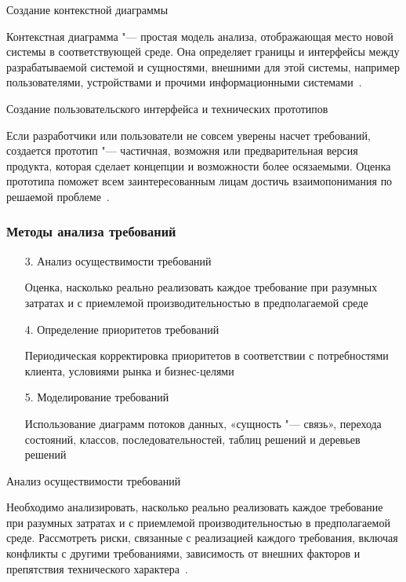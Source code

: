 \documentclass{../industrial-development}
\begin{document}
\alert{Создание контекстной диаграммы}

Контекстная диаграмма "--- простая модель анализа, отображающая место новой системы в соответствующей среде. Она определяет границы и интерфейсы между разрабатываемой системой и сущностями, внешними для этой системы, например пользователями, устройствами и прочими информационными системами~\cite[с.~48]{Wiegers}.

\alert{Создание пользовательского интерфейса и технических прототипов}

Если разработчики или пользователи не совсем уверены насчет требований, создается прототип "--- частичная, возможня или предварительная версия продукта, которая сделает концепции и возможности более осязаемыми. Оценка прототипа поможет всем заинтересованным лицам достичь взаимопонимания по решаемой проблеме~\cite[с.~48]{Wiegers}.


\begin{frame} \frametitle{Методы анализа требований}
\begin{itemize}
\item[3.] Анализ осуществимости требований

{\small Оценка, насколько реально реализовать каждое требование при разумных затратах и с приемлемой производительностью в предполагаемой среде}

\item[4.] Определение приоритетов требований

{\small Периодическая корректировка приоритетов в соответствии с потребностями клиента, условиями рынка и бизнес-целями}

\item[5.] Моделирование требований

{\small Использование диаграмм потоков данных, «сущность "--- связь», перехода состояний, классов, последовательностей, таблиц решений и деревьев решений}

\end{itemize}
\end{frame}

\lecturenotes

\alert{Анализ осуществимости требований}

Необходимо анализировать, насколько реально реализовать каждое требование при разумных затратах и с приемлемой производительностью в предполагаемой среде. Рассмотреть риски, связанные с реализацией каждого требования, включая конфликты с другими требованиями, зависимость от внешних факторов и препятствия технического характера~\cite[с.~48]{Wiegers}.
\end{document}
